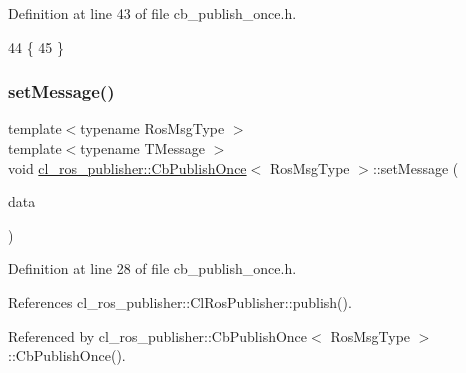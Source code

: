Definition at line 43 of file cb\+\_\+publish\+\_\+once.\+h.


\begin{DoxyCode}
44     \{
45     \}
\end{DoxyCode}
\mbox{\label{classcl__ros__publisher_1_1CbPublishOnce_aedf3cb7940951d76773f46c807f34a58}} 
\subsubsection{\texorpdfstring{set\+Message()}{setMessage()}}
{\footnotesize\ttfamily template$<$typename Ros\+Msg\+Type $>$ \\
template$<$typename T\+Message $>$ \\
void \hyperlink{classcl__ros__publisher_1_1CbPublishOnce}{cl\+\_\+ros\+\_\+publisher\+::\+Cb\+Publish\+Once}$<$ Ros\+Msg\+Type $>$\+::set\+Message (\begin{DoxyParamCaption}\item[{const T\+Message \&}]{data }\end{DoxyParamCaption})\hspace{0.3cm}{\ttfamily [inline]}}



Definition at line 28 of file cb\+\_\+publish\+\_\+once.\+h.



References cl\+\_\+ros\+\_\+publisher\+::\+Cl\+Ros\+Publisher\+::publish().



Referenced by cl\+\_\+ros\+\_\+publisher\+::\+Cb\+Publish\+Once$<$ Ros\+Msg\+Type $>$\+::\+Cb\+Publish\+Once().



